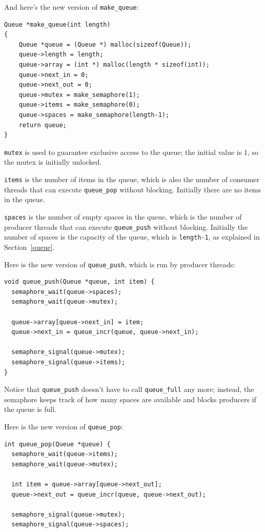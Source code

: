 \documentclass[12pt]{book}
\begin{document}
{And here's the new version of \verb"make_queue":

\begin{verbatim}
Queue *make_queue(int length)
{
    Queue *queue = (Queue *) malloc(sizeof(Queue));
    queue->length = length;
    queue->array = (int *) malloc(length * sizeof(int));
    queue->next_in = 0;
    queue->next_out = 0;
    queue->mutex = make_semaphore(1);
    queue->items = make_semaphore(0);
    queue->spaces = make_semaphore(length-1);
    return queue;
}
\end{verbatim}

{\tt mutex} is used to guarantee exclusive access to the queue;
the initial value is 1, so the mutex is
initially unlocked.

{\tt items} is the number of items in the queue, which is also the number
of consumer threads that can execute \verb"queue_pop" without blocking.
Initially there are no items in the queue.

{\tt spaces} is the number of empty spaces in the queue, which is the
number of producer threads that can execute \verb"queue_push" without
blocking.  Initially the number of spaces is the capacity of the queue,
which is {\tt length-1}, as explained in Section~\ref{queue}.

Here is the new version of \verb"queue_push", which is run by
producer threads:

\begin{verbatim}
void queue_push(Queue *queue, int item) {
  semaphore_wait(queue->spaces);
  semaphore_wait(queue->mutex);

  queue->array[queue->next_in] = item;
  queue->next_in = queue_incr(queue, queue->next_in);

  semaphore_signal(queue->mutex);
  semaphore_signal(queue->items);
}
\end{verbatim}

Notice that \verb"queue_push" doesn't have to call
\verb"queue_full" any more; instead, the semaphore keeps track of
how many spaces are available and blocks producers if the queue
is full.

Here is the new version of \verb"queue_pop":

\begin{verbatim}
int queue_pop(Queue *queue) {
  semaphore_wait(queue->items);
  semaphore_wait(queue->mutex);
  
  int item = queue->array[queue->next_out];
  queue->next_out = queue_incr(queue, queue->next_out);

  semaphore_signal(queue->mutex);
  semaphore_signal(queue->spaces);


\end{verbatim}}
\end{document}
